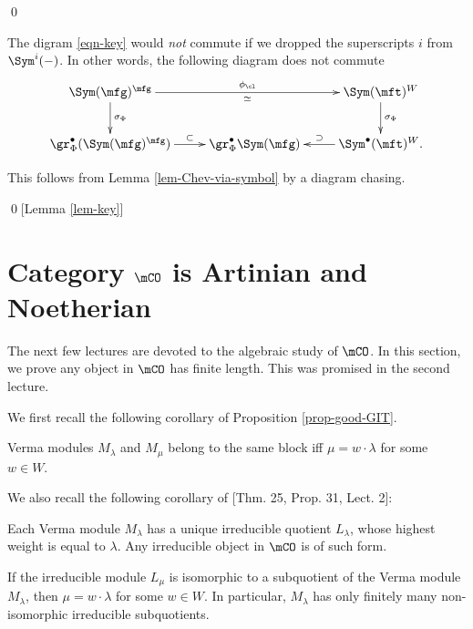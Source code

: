 		\qed

	\begin{warn}
			The digram \eqref{eqn-key} would \emph{not} commute if we dropped the superscripts $i$ from $\Sym^i(-)$. In other words, the following diagram does not commute
			\[
			\xymatrix{
				\Sym(\mfg)^\mfg \ar[d]^-{\sigma_\Phi} \ar[rr]^-{\phi_\cl}_-\simeq
				& 
				& \Sym(\mft)^W  \ar[d]^-{\sigma_\Phi} \\
				\gr_\Phi^\bullet(\Sym(\mfg)^\mfg) \ar[r]^-\subset
				& \gr_\Phi^\bullet \Sym(\mfg) 
				& \Sym^\bullet(\mft)^W. \ar[l]_-\supset
			}
			\]
	\end{warn}


		This follows from Lemma \ref{lem-Chev-via-symbol} by a diagram chasing.

	\qed[Lemma \ref{lem-key}]



\section{Category \texorpdfstring{$\mCO$}{O} is Artinian and Noetherian}

	The next few lectures are devoted to the algebraic study of $\mCO$. In this section, we prove any object in $\mCO$ has finite length. This was promised in the second lecture.

	We first recall the following corollary of Proposition \ref{prop-good-GIT}.

	\begin{prop}
		Verma modules $M_\lambda$ and $M_\mu$ belong to the same block iff $\mu = w\cdot \lambda$ for some $w\in W$.
	\end{prop}

	We also recall the following corollary of [Thm. 25, Prop. 31, Lect. 2]:

	\begin{prop}
		Each Verma module $M_\lambda$ has a unique irreducible quotient $L_\lambda$, whose highest weight is equal to $\lambda$. Any irreducible object in $\mCO$ is of such form.
	\end{prop}

	\begin{cor}
		\label{cor-irresubq-of-Verma}
		If the irreducible module $L_\mu$ is isomorphic to a subquotient of the Verma module $M_\lambda$, then $\mu = w\cdot \lambda$ for some $w\in W$. In particular, $M_\lambda$ has only finitely many non-isomorphic irreducible subquotients.
	\end{cor}

